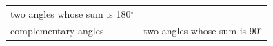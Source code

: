 {\begin{tabular}[t]{|l|l|l|}
    \multicolumn{2}{c|}{two angles whose sum is 180\begin{math}{}^{\circ }\end{math}}
     \tabularnewline\cline{1-1}\cline{2-2}\cline{3-3}
        complementary angles &
    \multicolumn{2}{c|}{two angles whose sum is 90\begin{math}{}^{\circ }\end{math}}
     \tabularnewline\cline{1-1}\cline{2-2}\cline{3-3}
    \end{tabular}} %
        \addtolength{\mytableboxheight}{\mytableboxdepth}
